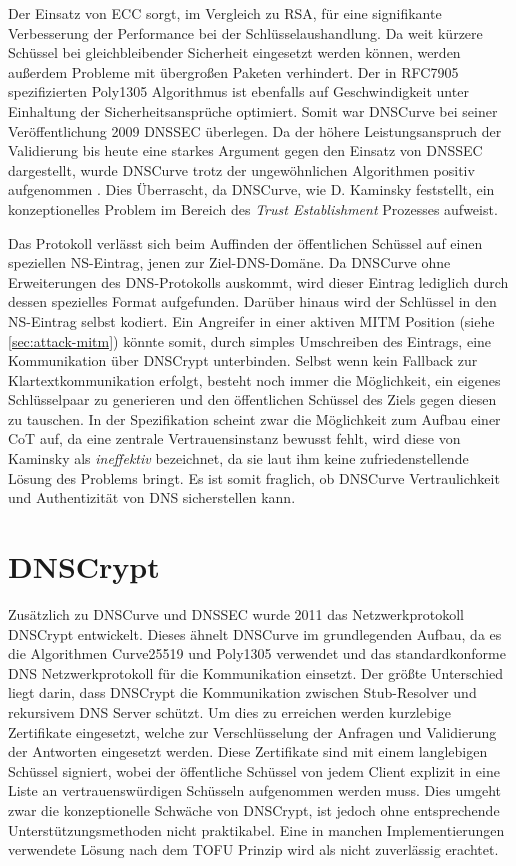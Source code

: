Der Einsatz von \ac{ECC} sorgt, im Vergleich zu RSA, für eine signifikante Verbesserung der Performance bei der Schlüsselaushandlung. Da weit kürzere Schüssel bei gleichbleibender Sicherheit eingesetzt werden können, werden außerdem Probleme mit übergroßen Paketen verhindert\cite{Gupta2002}. Der in RFC7905\cite{rfc7905} spezifizierten Poly1305 Algorithmus ist ebenfalls auf Geschwindigkeit unter Einhaltung der Sicherheitsansprüche optimiert\cite{Bernstein2005}. Somit war DNSCurve bei seiner Veröffentlichung 2009 \ac{DNSSEC} überlegen. Da der höhere Leistungsanspruch der Validierung bis heute eine starkes Argument gegen den Einsatz von \ac{DNSSEC} dargestellt, wurde DNSCurve trotz der ungewöhnlichen Algorithmen positiv aufgenommen \cite{Henry2013}. Dies Überrascht, da DNSCurve, wie D. Kaminsky feststellt, ein konzeptionelles Problem im Bereich des \textit{Trust Establishment} Prozesses aufweist\cite{Kaminsky2011}. 

Das Protokoll verlässt sich beim Auffinden der öffentlichen Schüssel auf einen speziellen NS-Eintrag, jenen zur Ziel-DNS-Domäne. Da DNSCurve ohne Erweiterungen des DNS-Protokolls auskommt, wird dieser Eintrag lediglich durch dessen spezielles Format aufgefunden. Darüber hinaus wird der Schlüssel in den NS-Eintrag selbst kodiert. Ein Angreifer in einer aktiven MITM Position (siehe \ref{sec:attack-mitm}) könnte somit, durch simples Umschreiben des Eintrags, eine Kommunikation über DNSCrypt unterbinden. Selbst wenn kein Fallback zur Klartextkommunikation erfolgt, besteht noch immer die Möglichkeit, ein eigenes Schlüsselpaar zu generieren und den öffentlichen Schüssel des Ziels gegen diesen zu tauschen. In der Spezifikation scheint zwar die Möglichkeit zum Aufbau einer CoT auf, da eine zentrale Vertrauensinstanz bewusst fehlt, wird diese von Kaminsky als \textit{ineffektiv} bezeichnet, da sie laut ihm keine zufriedenstellende Lösung des Problems bringt. Es ist somit fraglich, ob DNSCurve  Vertraulichkeit und Authentizität von DNS sicherstellen kann.  

\section{DNSCrypt}
Zusätzlich zu DNSCurve und \ac{DNSSEC} wurde 2011 das Netzwerkprotokoll DNSCrypt entwickelt. Dieses ähnelt DNSCurve im grundlegenden Aufbau, da es die Algorithmen Curve25519 und Poly1305 verwendet und das standardkonforme DNS Netzwerkprotokoll für die Kommunikation einsetzt. Der größte Unterschied liegt darin, dass DNSCrypt die Kommunikation zwischen Stub-Resolver und rekursivem DNS Server schützt. Um dies zu erreichen werden kurzlebige Zertifikate eingesetzt, welche zur Verschlüsselung der Anfragen und Validierung der Antworten eingesetzt werden. Diese Zertifikate sind mit einem langlebigen Schüssel signiert, wobei der öffentliche Schüssel von jedem Client explizit in eine Liste an vertrauenswürdigen Schüsseln aufgenommen werden muss\cite{Denis2016}. Dies umgeht zwar die konzeptionelle Schwäche von DNSCrypt, ist jedoch ohne entsprechende Unterstützungsmethoden nicht praktikabel. Eine in manchen Implementierungen verwendete Lösung nach dem \ac{TOFU} Prinzip wird als nicht zuverlässig erachtet\cite{Wendlandt2008}. 

